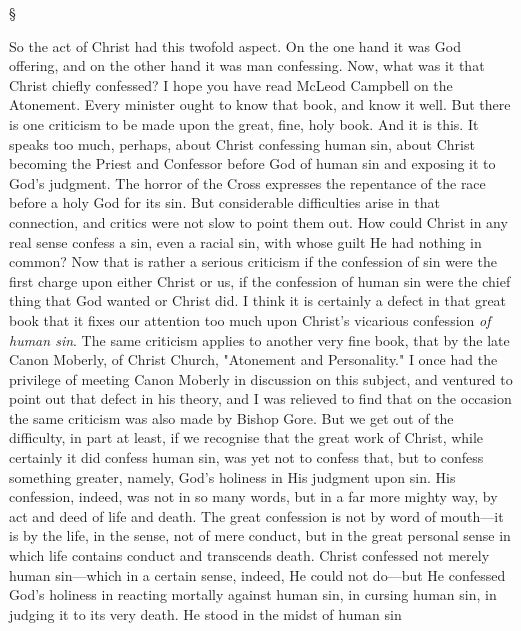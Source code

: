 \documentclass[12pt,letterpaper,oneside]{book}
\begin{document}
\begin{center}
\S
\end{center}

So the act of Christ had this twofold aspect. 
On the one hand it was God offering, and on the 
other hand it was man confessing. Now, what 
was it that Christ chiefly confessed? I hope you 
have read McLeod Campbell on the Atonement. 
Every minister ought to know that book, and 
know it well. But there is one criticism to be 
made upon the great, fine, holy book. And it 
is this. It speaks too much, perhaps, about 
Christ confessing human sin, about Christ 
becoming the Priest and Confessor before God 
of human sin and exposing it to God's judgment. 
The horror of the Cross expresses the repentance 
of the race before a holy God for its sin. 
But considerable difficulties arise in that connection, 
and critics were not slow to point them 
out. How could Christ in any real sense confess 
a sin, even a racial sin, with whose guilt He 
had nothing in common? Now that is rather a 
serious criticism if the confession of sin were 
the first charge upon either Christ or us, if the 
confession of human sin were the chief thing 
that God wanted or Christ did. I think it is 
certainly a defect in that great book that 
it fixes our attention too much upon Christ's 
vicarious confession \textit{of human sin}. The same 
criticism applies to another very fine book, 
that by the late Canon Moberly, of Christ 
Church, "Atonement and Personality." I once 
had the privilege of meeting Canon Moberly 
in discussion on this subject, and ventured to 
point out that defect in his theory, and I was 
relieved to find that on the occasion the same 
criticism was also made by Bishop Gore. But 
we get out of the difficulty, in part at least, if we 
recognise that the great work of Christ, while 
certainly it did confess human sin, was yet not 
to confess that, but to confess something greater, 
namely, God's holiness in His judgment upon 
sin. His confession, indeed, was not in so many 
words, but in a far more mighty way, by act and 
deed of life and death. The great confession is 
not by word of mouth---it is by the life, in the 
sense, not of mere conduct, but in the great 
personal sense in which life contains conduct 
and transcends death. Christ confessed not 
merely human sin---which in a certain sense, 
indeed, He could not do---but He confessed God's 
holiness in reacting mortally against human sin, 
in cursing human sin, in judging it to its very 
death. He stood in the midst of human sin 
\end{document}
